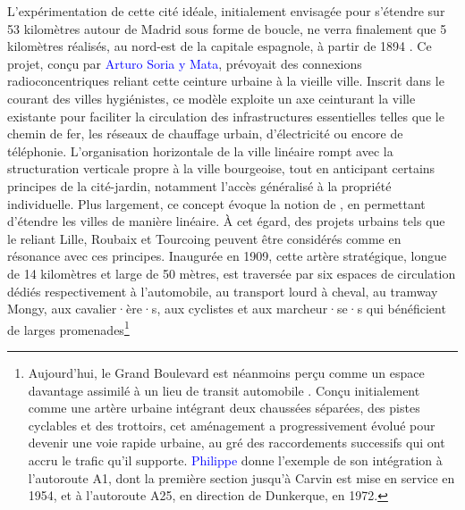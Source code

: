 \begin{refsegment}
L’expérimentation de cette cité idéale, initialement envisagée pour s’étendre sur 53 kilomètres autour de Madrid sous forme de boucle, ne verra finalement que 5 kilomètres réalisés, au nord-est de la capitale espagnole, à partir de 1894 \textcolor{blue}{\autocite[722]{furundzic_infrastructure_2012}}. Ce projet, conçu par \textcolor{blue}{Arturo Soria y Mata}, prévoyait des connexions radioconcentriques reliant cette ceinture urbaine à la vieille ville. Inscrit dans le courant des villes hygiénistes, ce modèle exploite un axe ceinturant la ville existante pour faciliter la circulation des infrastructures essentielles telles que le chemin de fer, les réseaux de chauffage urbain, d’électricité ou encore de téléphonie. L’organisation horizontale de la ville linéaire rompt avec la structuration verticale propre à la ville bourgeoise, tout en anticipant certains principes de la cité-jardin, notamment l’accès généralisé à la propriété individuelle. Plus largement, ce concept évoque la notion de  \textcolor{blue}{\autocite[63]{liu_corridors_2016}}, en permettant d’étendre les villes de manière linéaire. À cet égard, des projets urbains tels que le  reliant Lille, Roubaix et Tourcoing peuvent être considérés comme en résonance avec ces principes. Inaugurée en 1909, cette artère stratégique, longue de 14 kilomètres et large de 50 mètres, est traversée par six espaces de circulation dédiés respectivement à l'automobile, au transport lourd à cheval, au tramway Mongy, aux cavalier·ère·s, aux cyclistes et aux marcheur·se·s qui bénéficient de larges promenades\footnote{
        Aujourd’hui, le Grand Boulevard est néanmoins perçu comme un espace davantage assimilé à un lieu de transit automobile \textcolor{blue}{\autocite[139]{maitre_ambivalence_2016}}. Conçu initialement comme une artère urbaine intégrant deux chaussées séparées, des pistes cyclables et des trottoirs, cet aménagement a progressivement évolué pour devenir une voie rapide urbaine, au gré des raccordements successifs qui ont accru le trafic qu’il supporte. \textcolor{blue}{Philippe} \textcolor{blue}{\textcite[155]{menerault_gares_2008}} donne l'exemple de son intégration à l'autoroute A1, dont la première section jusqu'à Carvin est mise en service en 1954, et à l'autoroute A25, en direction de Dunkerque, en 1972.
}
\end{refsegment}
